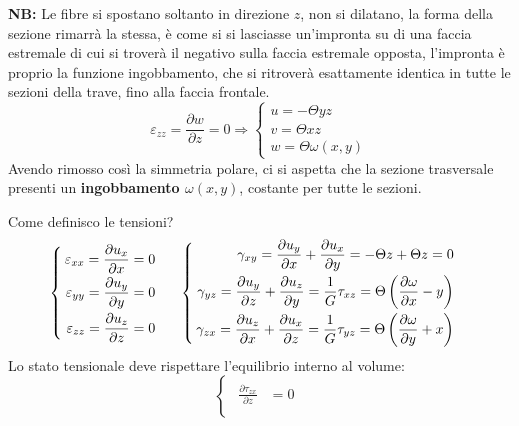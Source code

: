 \documentclass{article}
\begin{document}
\begin{adjustwidth}{2in}{}
		\textbf{NB:} Le fibre si spostano soltanto in direzione $z$, non si dilatano, la forma della sezione rimarrà la stessa, è come si si lasciasse un'impronta su di una faccia estremale di cui si troverà il negativo sulla faccia estremale opposta, l'impronta è proprio la funzione ingobbamento, che si ritroverà esattamente identica in tutte le sezioni della trave, fino alla faccia frontale.  		
		\[ \varepsilon_{zz} = \dfrac{\partial w}{\partial z} = 0 \Rightarrow \begin{cases}
			u = -\Theta yz  \\
			v =  \Theta xz  \\
			w = \Theta \omega(x,y)
		\end{cases} \]
		Avendo rimosso così la simmetria polare, ci si aspetta
		che la sezione trasversale presenti un \textbf{ingobbamento $\omega(x,y)$},
		costante per tutte le sezioni.\newline 
		
		Come definisco le tensioni? 
		\[ 
		\begin{cases}
			\begin{aligned}
				\varepsilon_{xx} =   \frac{\partial u_x}{\partial x} = 0 \\
				\varepsilon_{yy} =   \frac{\partial u_y}{\partial y} = 0 \\
				\varepsilon_{zz} =   \frac{\partial u_z}{\partial z} = 0 \\
			\end{aligned}
		\end{cases} \hspace{0.2cm} \begin{cases}
			\begin{aligned}
				\gamma_{xy} =   \frac{\partial u_y}{\partial x} + \frac{\partial u_x}{\partial y} = -\Theta z + \Theta z = 0\\
				\gamma_{yz} =   \frac{\partial u_y}{\partial z} + \frac{\partial u_z}{\partial y} = \dfrac{1}{G} \tau_{xz} = \Theta \left(\dfrac{\partial \omega}{\partial x}-y\right) \\
				\gamma_{zx} =   \frac{\partial u_z}{\partial x} + \frac{\partial u_x}{\partial z} = \dfrac{1}{G} \tau_{yz} = \Theta \left(\dfrac{\partial \omega}{\partial y} + x\right)\\
			\end{aligned}
		\end{cases}
		\]
		Lo stato tensionale deve rispettare l’equilibrio interno al volume:
		\[
		\begin{cases}
			\begin{aligned}
				\frac{\partial \tau_{zx}}{\partial z} & =0 \\
				

\end{aligned}
\end{cases}\]
\end{adjustwidth}
\end{document}
